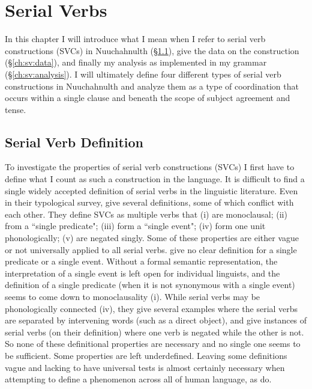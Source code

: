 \chapter{Serial Verbs} \label{ch:sv}

In this chapter I will introduce what I mean when I refer to serial verb constructions (SVCs) in Nuuchahnulth (\S\ref{ch:sv:def}), give the data on the construction (\S\ref{ch:sv:data}), and finally my analysis as implemented in my grammar (\S\ref{ch:sv:analysis}). I will ultimately define four different types of serial verb constructions in Nuuchahnulth and analyze them as a type of coordination that occurs within a single clause and beneath the scope of subject agreement and tense.

\section{Serial Verb Definition} \label{ch:sv:def}

To investigate the properties of serial verb constructions (SVCs) I first have to define what I count as such a construction in the language.  It is difficult to find a single widely accepted definition of serial verbs in the linguistic literature. Even in their typological survey, \cite{aikhenvalddixon2006} give several definitions, some of which conflict with each other. They define SVCs as multiple verbs that (i) are monoclausal; (ii) from a ``single predicate"; (iii) form a ``single event"; (iv) form one unit phonologically; (v) are negated singly. Some of these properties are either vague or not universally applied to all serial verbs. \citeauthor{aikhenvalddixon2006} give no clear definition for a single predicate or a single event. Without a formal semantic representation, the interpretation of a single event is left open for individual linguists, and the definition of a single predicate (when it is not synonymous with a single event) seems to come down to monoclausality (i). While serial verbs may be phonologically connected (iv), they give several examples where the serial verbs are separated by intervening words (such as a direct object), and give instances of serial verbs (on their definition) where one verb is negated while the other is not. So none of these definitional properties are necessary and no single one seems to be sufficient. Some properties are left underdefined. Leaving some definitions vague and lacking to have universal tests is almost certainly necessary when attempting to define a phenomenon across all of human language, as \citeauthor{aikhenvalddixon2006} do.

